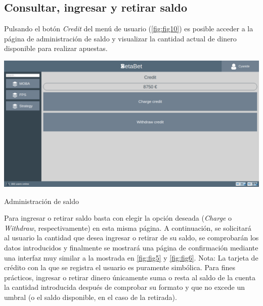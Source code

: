 \documentclass{article}
\begin{document}
\subsection{Consultar, ingresar y retirar saldo}
Pulsando el botón \textit{Credit} del menú de usuario (\autoref{fig:fig10}) es posible acceder a la página de administración de saldo y visualizar la cantidad actual de dinero disponible para realizar apuestas.
\smallbreak
\begin{minipage}{\linewidth}
    \centering
    \captionsetup{type=figure}
    \includegraphics[width=\linewidth]{fig11}
    \caption{Administración de saldo}
    \label{fig:fig11}
\end{minipage}
\bigbreak
Para ingresar o retirar saldo basta con elegir la opción deseada (\textit{Charge} o \textit{Withdraw}, respectivamente) en esta misma página. A continuación, se solicitará al usuario la cantidad que desea ingresar o retirar de su saldo, se comprobarán los datos introducidos y finalmente se mostrará una página de confirmación mediante una interfaz muy similar a la mostrada en \autoref{fig:fig5} y \autoref{fig:fig6}.
\smallbreak
Nota: La tarjeta de crédito con la que se registra el usuario es puramente simbólica. Para fines prácticos, ingresar o retirar dinero únicamente suma o resta al saldo de la cuenta la cantidad introducida después de comprobar su formato y que no excede un umbral (o el saldo disponible, en el caso de la retirada).
\newpage
\end{document}
